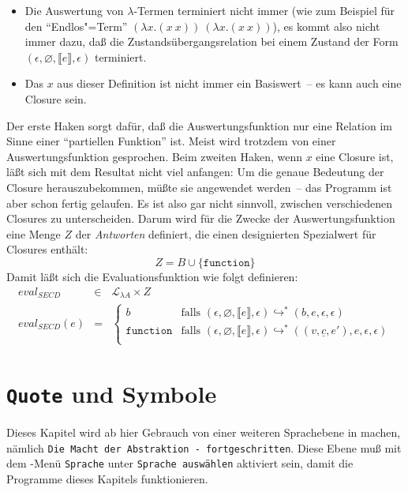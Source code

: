 %
\begin{itemize}
\item Die Auswertung von $\lambda$-Termen terminiert nicht immer (wie
  zum Beispiel für den "`Endlos"=Term"' $(\lambda x.(x~x))~(\lambda x.(x~x))$), es kommt
  also nicht immer dazu, daß die Zustandsübergangsrelation bei einem
  Zustand der Form $(\epsilon, \varnothing, \llbracket e\rrbracket,
  \epsilon)$ terminiert.
\item Das $x$ aus dieser Definition ist nicht immer ein Basiswert~--
  es kann auch eine Closure sein.
\end{itemize}
%
Der erste Haken sorgt dafür, daß die Auswertungsfunktion nur eine
Relation im Sinne einer "`partiellen Funktion"' ist.  Meist wird
trotzdem von einer Auswertungsfunktion gesprochen.  Beim zweiten
Haken, wenn $x$ eine Closure ist, läßt sich mit dem Resultat nicht
viel anfangen: Um die genaue Bedeutung der Closure herauszubekommen,
müßte sie angewendet werden~-- das Programm ist aber schon fertig
gelaufen.  Es ist also gar nicht sinnvoll, zwischen verschiedenen
Closures zu unterscheiden.  Darum wird für die Zwecke der
Auswertungsfunktion eine Menge $Z$ der \textit{Antworten}
definiert, die einen designierten Spezialwert für Closures enthält:
%
\begin{displaymath}
  Z = B \cup \{ \texttt{function} \}
\end{displaymath}
%
Damit läßt sich die Evaluationsfunktion wie folgt definieren:
%
\begin{eqnarray*}
  \mathit{eval}_\mathit{SECD} & \in & \mathcal{L}_{\lambda{}A} \times Z\\
  \mathit{eval}_\mathit{SECD}(e) & = &
  \begin{cases}
    b & \textrm{falls } (\epsilon, \varnothing, \llbracket e\rrbracket, \epsilon)
    \hookrightarrow^* (b, e, \epsilon, \epsilon)\\
    \texttt{function} & \textrm{falls } (\epsilon, \varnothing, \llbracket e\rrbracket, \epsilon)
    \hookrightarrow^* ((v, \underline{c}, e'), e, \epsilon, \epsilon)\\
  \end{cases}
\end{eqnarray*}

\section{\texttt{Quote} und Symbole}
\label{sec:quote}

Dieses Kapitel wird ab hier Gebrauch von einer weiteren
Sprachebene in
\drscheme{} machen, nämlich \texttt{Die Macht der Abstraktion -
  fortgeschritten}.  Diese Ebene muß mit dem \drscheme{}-Menü \texttt{Sprache}
unter \texttt{Sprache auswählen} aktiviert sein, damit die
Programme dieses Kapitels funktionieren.

